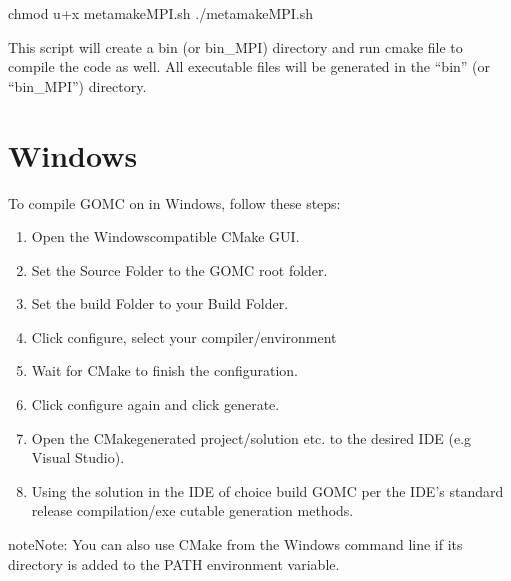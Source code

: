 \documentclass[letterpaper,10pt,english]{sphinxmanual}
\begin{document}
\begin{sphinxVerbatim}[commandchars=\\\{\}]
\PYGZdl{} chmod u+x metamakeMPI.sh
\PYGZdl{} ./metamakeMPI.sh
\end{sphinxVerbatim}

This script will create a bin (or bin\_MPI) directory and run cmake file to compile the code as well. All executable files will be generated in the “bin” (or “bin\_MPI”) directory.


\section{Windows}
\label{\detokenize{compiling:windows}}
To compile GOMC on in Windows, follow these steps:
\begin{enumerate}
%
\item {} 
Open the Windows\sphinxhyphen{}compatible CMake GUI.

\item {} 
Set the Source Folder to the GOMC root folder.

\item {} 
Set the build Folder to your Build Folder.

\item {} 
Click configure, select your compiler/environment

\item {} 
Wait for CMake to finish the configuration.

\item {} 
Click configure again and click generate.

\item {} 
Open the CMake\sphinxhyphen{}generated project/solution etc. to the desired IDE (e.g Visual Studio).

\item {} 
Using the solution in the IDE of choice build GOMC per the IDE’s standard release compilation/exe\sphinxhyphen{} cutable generation methods.

\end{enumerate}

\begin{sphinxadmonition}{note}{Note:}
You can also use CMake from the Windows command line if its directory is added to the PATH environment variable.
\end{sphinxadmonition}
\end{document}
